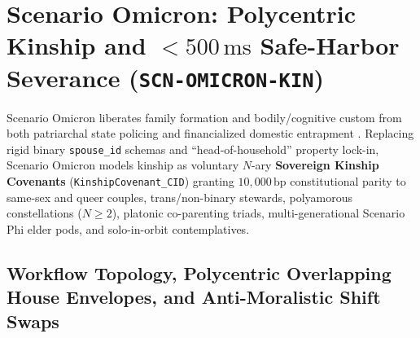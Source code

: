 \section{Scenario Omicron: Polycentric Kinship and $< 500\,\mathrm{ms}$ Safe-Harbor Severance (\texttt{SCN-OMICRON-KIN})}
\label{sec:wave-c-omicron}

Scenario Omicron liberates family formation and bodily/cognitive custom from both patriarchal
state policing and financialized domestic entrapment \parencite{hirschman1970,freeman1972}.
Replacing rigid binary \texttt{spouse\_id} schemas and ``head-of-household'' property lock-in,
Scenario Omicron models kinship as voluntary $N$-ary \textbf{Sovereign Kinship Covenants}
(\texttt{KinshipCovenant\_CID}) granting $10{,}000\,\mathrm{bp}$ constitutional parity to
same-sex and queer couples, trans/non-binary stewards, polyamorous constellations
($N \ge 2$), platonic co-parenting triads, multi-generational Scenario Phi elder pods, and
solo-in-orbit contemplatives.

\subsection{Workflow Topology, Polycentric Overlapping House Envelopes, and Anti-Moralistic Shift Swaps}


